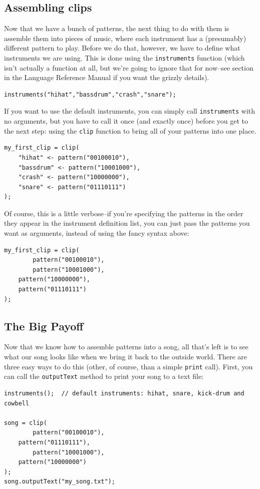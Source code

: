 \subsection{Assembling clips}

Now that we have a bunch of patterns, the next thing to do with them is assemble them into pieces of music, where each instrument has a (presumably) different pattern to play.  Before we do that, however, we have to define what instruments we are using.  This is done using the {\tt instruments} function (which isn't actually a function at all, but we're going to ignore that for now--see section \label{instrSection} in the Language Reference Manual if you want the grizzly details).
\begin{lstlisting}
instruments("hihat","bassdrum","crash","snare");
\end{lstlisting}
If you want to use the default instruments, you can simply call {\tt instruments} with no arguments, but you have to call it once (and exactly once) before you get to the next step: using the {\tt clip} function to bring all of your patterns into one place.
\begin{lstlisting}
my_first_clip = clip(
    "hihat" <- pattern("00100010"),
    "bassdrum" <- pattern("10001000"),
    "crash" <- pattern("10000000"),
    "snare" <- pattern("01110111")
);
\end{lstlisting}
Of course, this is a little verbose--if you're specifying the patterns in the order they appear in the instrument definition list, you can just pass the patterns you want as arguments, instead of using the fancy syntax above:
\begin{lstlisting}
my_first_clip = clip(
    	pattern("00100010"),
    	pattern("10001000"),
	pattern("10000000"),
	pattern("01110111")
);
\end{lstlisting}

\subsection{The Big Payoff}
Now that we know how to assemble patterns into a song, all that's left is to see what our song looks like 
when we bring it back to the outside world.  There are three easy ways to do this (other, of course, than a simple {\tt print} call).  First, you can call the {\tt outputText} method to print your song to a text file:
\begin{lstlisting}
instruments();  // default instruments: hihat, snare, kick-drum and cowbell

song = clip(
    	pattern("00100010"),
	pattern("01110111"),
    	pattern("10001000"),
	pattern("10000000")
);
song.outputText("my_song.txt");
\end{lstlisting}

